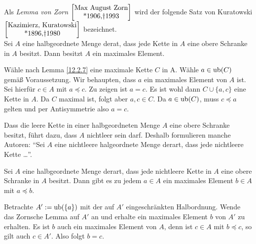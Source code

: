 \documentclass[../../main.tex]{subfiles}
\begin{document}
\begin{sat}\label{12.2.8}
Als \emph{Lemma von Zorn} $\left[\begin{matrix*}\text{Max August Zorn}\\ \text{*1906,\dag 1993}\end{matrix*}\right]$ wird der folgende Satz von Kuratowski $\left[\begin{matrix*}\text{Kazimierz, Kuratowski}\\ \text{*1896,\dag 1980}\end{matrix*}\right]$ bezeichnet.\\
Sei $A$ eine halbgeordnete Menge derat, dass jede Kette in $A$ eine obere Schranke in $A$ besitzt. Dann besitzt $A$ ein maximales Element.
		
\end{sat}
\begin{cproof} Wähle nach Lemma \eqref{12.2.7} eine maximale Kette $C$ in A. Wähle $a\in\operatorname{ub}(C)$ gemäß Voraussetzung. Wir behaupten, dass $a$ ein maximales Element von $A$ ist. Sei hierfür $c\in A$ mit $a\preceq c$. Zu zeigen ist $a=c$. Es ist wohl dann $C\cup\{a,c\}$ eine Kette in $A$. Da $C$ maximal ist, folgt aber $a,c\in C$. Da $a\in\operatorname{ub}(C)$, muss $c\preceq a$ gelten und per Antisymmetrie also $a=c$.
\end{cproof}

\begin{bem}\label{12.2.9}
Dass die leere Kette in einer halbgeordneten Menge $A$ eine obere Schranke besitzt, führt dazu, dass $A$ nichtleer sein darf. Deshalb formulieren manche Autoren: \enquote{Sei $A$ eine nichtleere halgeordnete Menge derart, dass jede nichtleere Kette \ldots}.
\end{bem}

\begin{kor}\label{12.2.10}
Sei $A$ eine halbgeordnete Menge derart, dass jede nichtleere Kette in $A$ eine obere Schranke in $A$ besitzt. Dann gibt es zu jedem $a\in A$ ein maximales Element $b\in A$ mit $a\preceq b$.
\end{kor}
\begin{cproof}
Betrachte $A':=\operatorname{ub}(\{a\})$ mit der auf $A'$ eingeschränkten Halbordnung. Wende das Zornsche Lemma auf $A'$ an und erhalte ein maximales Element $b$ von $A'$ zu erhalten. Es ist $b$ auch ein maximales Element von $A$, denn ist $c\in A$ mit $b\preceq c$, so gilt auch $c\in A'$. Also folgt $b=c$.
\end{cproof}
\end{document}
